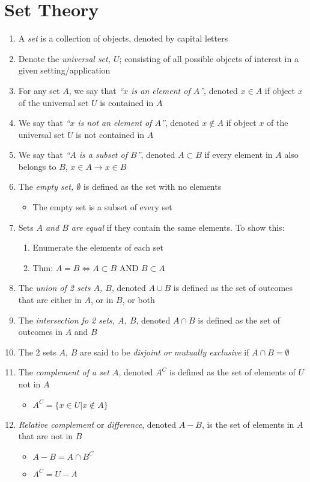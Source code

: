 \section{Set Theory}\label{sec:Set Theory}
\begin{enumerate}
\item A \emph{set} is a collection of objects, denoted by capital letters
\item Denote the \emph{universal set, $U$}; consisting of all possible objects of interest in a given setting/application
\item For any set $A$, we say that \emph{``$x$ is an element of $A$''}, denoted $x \in A$ if object $x$ of the universal set $U$ is contained in $A$
\item We say that \emph{``$x$ is not an element of $A$''}, denoted $x \notin A$ if object $x$ of the universal set $U$ is not contained in $A$
\item We say that \emph{``$A$ is a subset of $B$''}, denoted $A \subset B$ if every element in $A$ also belongs to $B$, $x \in A \rightarrow x \in B$
\item The \emph{empty set, $\emptyset$} is defined as the set with no elements
  \begin{itemize}[noitemsep, nolistsep]
  \item The empty set is a subset of every set
  \end{itemize}
\item Sets \emph{$A$ and $B$ are equal} if they contain the same elements. To show this:
  \begin{enumerate}
  \item Enumerate the elements of each set
  \item Thm: $A=B \iff A \subset B$ AND $B \subset A$
  \end{enumerate}
\item The \emph{union of 2 sets $A$, $B$}, denoted $A \cup B$ is defined as the set of outcomes that are either in $A$, or in $B$, or both
\item The \emph{intersection fo 2 sets, $A$, $B$}, denoted $A \cap B$ is defined as the set of outcomes in $A$ and $B$
\item The 2 sets $A$, $B$ are said to be \emph{disjoint or mutually exclusive} if $A \cap B = \emptyset$
\item The \emph{complement of a set $A$}, denoted $A^{C}$ is defined as the set of elements of $U$ not in $A$
  \begin{itemize}[noitemsep, nolistsep]
  \item $A^{C} = \lbrace x \in U \vert x \notin A \rbrace$
  \end{itemize}
\item \emph{Relative complement} or \emph{difference}, denoted $A-B$, is the set of elements in $A$ that are not in $B$
  \begin{itemize}[noitemsep, nolistsep]
  \item $A-B = A \cap B^{C}$
  \item $A^{C} = U - A$
  \end{itemize}
\end{enumerate}

